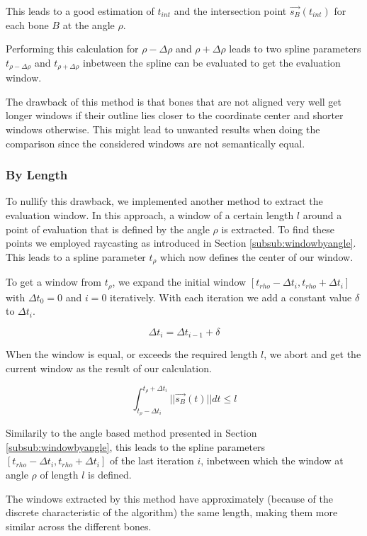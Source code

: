 \documentclass[pdftex,12pt,a4paper]{report}
\begin{document}
This leads to a good estimation of $t_{int}$ and the intersection point $\vec{s_B}(t_{int})$
for each bone $B$ at the angle $\rho$.

Performing this calculation for $\rho-\Delta\rho$ and $\rho+\Delta\rho$ leads to two spline
parameters $t_{\rho-\Delta\rho}$ and $t_{\rho+\Delta\rho}$ inbetween the spline can be 
evaluated to get the evaluation window.

The drawback of this method is that bones that are not aligned very well get longer windows
if their outline lies closer to the coordinate center and shorter windows otherwise. This 
might lead to unwanted results when doing the comparison since the considered windows are
not semantically equal. 

\subsubsection{By Length}

To nullify this drawback, we implemented another method to extract the evaluation window.
In this approach, a window of a certain length $l$ around a point of evaluation that is defined by the angle $\rho$ is extracted. To find these points we employed raycasting
as introduced in Section \ref{subsub:windowbyangle}. This leads to a spline parameter
$t_\rho$ which now defines the center of our window.

To get a window from $t_\rho$, we expand the initial window $[t_{rho}-\Delta t_i,
t_{rho}+\Delta t_i]$ with $\Delta t_0 = 0$ and $i=0$ iteratively. With each iteration we add a constant value $\delta$ to $\Delta t_i$.

\begin{equation}
\Delta t_i = \Delta t_{i-1} + \delta
\end{equation}

When the window is equal, or exceeds the required length $l$, we abort and get the current
window as the result of our calculation.

\begin{equation}
\int_{t_\rho - \Delta t_i}^{t_\rho + \Delta t_i} ||\vec{s_B}(t)|| dt \leq l
\end{equation}

Similarily to the angle based method presented in Section \ref{subsub:windowbyangle}, this leads to the spline parameters $[t_{rho}-\Delta t_i, t_{rho}+\Delta t_i]$ of the last iteration $i$, inbetween which the window at angle $\rho$ of length $l$ is defined.

The windows extracted by this method have approximately (because of the discrete
characteristic of the algorithm) the same length, making them more similar across
the different bones.
\end{document}
